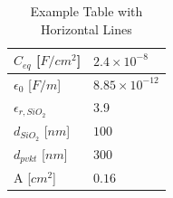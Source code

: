 \begin{table}[htbp]
    \centering
    \renewcommand{\arraystretch}{1.5} %
    \begin{tabular}{@{} l l @{}}
        \hline
        $C_{eq}$ [$F/cm^2$] & $2.4\times10^{-8}$\\ \hline
        $\epsilon_0$ [$F/m$]& $8.85\times10^{-12}$ \\ \hline
        $\epsilon_{r,SiO_2}$ & 3.9 \\ \hline
        $d_{SiO_2}$ [$nm$] & $100$ \\ \hline
        $d_{pvkt}$ [$nm$] & $300$ \\ \hline
        A [$cm^2$] & $0.16$ \\ \hline
    \end{tabular}
    \caption{Example Table with Horizontal Lines} %
    \label{tab:etl_opt:er_from_mos} %
\end{table}

